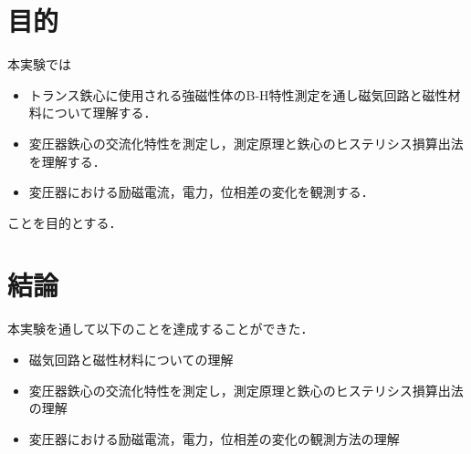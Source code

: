 \documentclass[11pt,dvipdfmx]{ujarticle}
\begin{document}
\begin{jikkenTitle}
\end{jikkenTitle}

\section{目的}
本実験では
\begin{itemize}
	\item トランス鉄心に使用される強磁性体のB-H特性測定を通し磁気回路と磁性材料について理解する．
	\item 変圧器鉄心の交流化特性を測定し，測定原理と鉄心のヒステリシス損算出法を理解する．
	\item 変圧器における励磁電流，電力，位相差の変化を観測する．
\end{itemize}
ことを目的とする．







\clearpage
\section{結論}
本実験を通して以下のことを達成することができた．
\begin{itemize}
	\item 磁気回路と磁性材料についての理解
	\item 変圧器鉄心の交流化特性を測定し，測定原理と鉄心のヒステリシス損算出法の理解
	\item 変圧器における励磁電流，電力，位相差の変化の観測方法の理解
\end{itemize}
\newpage
\printbibliography[title=参考文献]
\end{document}

